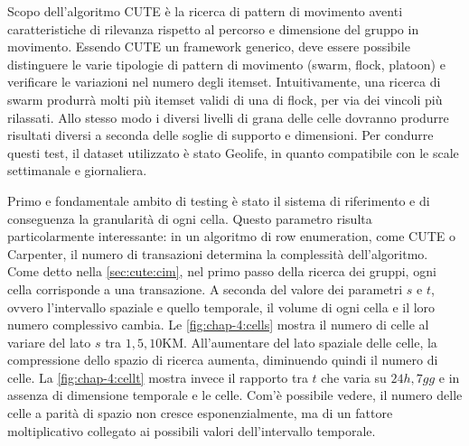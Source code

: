 Scopo dell'algoritmo CUTE è la ricerca di pattern di movimento aventi caratteristiche di rilevanza rispetto al percorso e dimensione del gruppo in movimento.
Essendo CUTE un framework generico, deve essere possibile distinguere le varie tipologie di pattern di movimento (swarm, flock, platoon) e verificare le variazioni nel numero degli itemset.
Intuitivamente, una ricerca di swarm produrrà molti più itemset validi di una di flock, per via dei vincoli più rilassati.
Allo stesso modo i diversi livelli di grana delle celle dovranno produrre risultati diversi a seconda delle soglie di supporto e dimensioni.
Per condurre questi test, il dataset utilizzato è stato Geolife, in quanto compatibile con le scale settimanale e giornaliera.

Primo e fondamentale ambito di testing è stato il sistema di riferimento e di conseguenza la granularità di ogni cella.
Questo parametro risulta particolarmente interessante: in un algoritmo di row enumeration, come CUTE o Carpenter, il numero di transazioni determina la complessità dell'algoritmo.
Come detto nella \cref{sec:cute:cim}, nel primo passo della ricerca dei gruppi, ogni cella corrisponde a una transazione.
A seconda del valore dei parametri \(s\) e \(t\), ovvero l'intervallo spaziale e quello temporale, il volume di ogni cella e il loro numero complessivo cambia.
Le \cref{fig:chap-4:cells} mostra il numero di celle al variare del lato \(s\) tra \(1,5,10\)KM.
All'aumentare del lato spaziale delle celle, la compressione dello spazio di ricerca aumenta, diminuendo quindi il numero di celle.
La \cref{fig:chap-4:cellt} mostra invece il rapporto tra \(t\) che varia su \(24h,7gg\) e in assenza di dimensione temporale e le celle. 
Com'è possibile vedere, il numero delle celle a parità di spazio non cresce esponenzialmente, ma di un fattore moltiplicativo collegato ai possibili valori dell'intervallo temporale.

